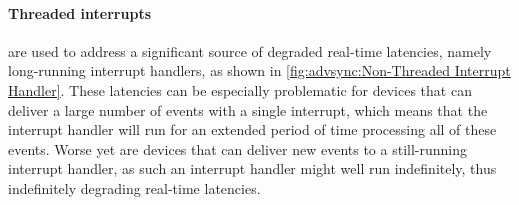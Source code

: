 
\paragraph{Threaded interrupts}
are used to address a significant source of degraded real-time latencies,
namely long-running interrupt handlers,
as shown in \cref{fig:advsync:Non-Threaded Interrupt Handler}.
These latencies can be especially problematic for devices that can
deliver a large number of events with a single interrupt, which means
that the interrupt handler will run for an extended period of time
processing all of these events.
Worse yet are devices that can deliver new events to a still-running
interrupt handler, as such an interrupt handler might well run
indefinitely, thus indefinitely degrading real-time latencies.

